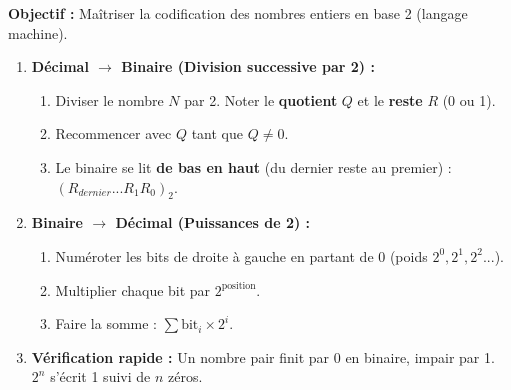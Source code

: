 \documentclass[11pt]{article}
\begin{document}
\begin{methode}
    \textbf{Objectif :} Maîtriser la codification des nombres entiers en base 2 (langage machine).
    \begin{enumerate}
        \item \textbf{Décimal $\to$ Binaire (Division successive par 2) :}
        \begin{enumerate}
            \item Diviser le nombre $N$ par 2. Noter le \textbf{quotient} $Q$ et le \textbf{reste} $R$ (0 ou 1).
            \item Recommencer avec $Q$ tant que $Q \neq 0$.
            \item Le binaire se lit \textbf{de bas en haut} (du dernier reste au premier) : $(R_{dernier} ... R_1 R_0)_2$.
        \end{enumerate}
        \item \textbf{Binaire $\to$ Décimal (Puissances de 2) :}
        \begin{enumerate}
            \item Numéroter les bits de droite à gauche en partant de 0 (poids $2^0, 2^1, 2^2...$).
            \item Multiplier chaque bit par $2^{\text{position}}$.
            \item Faire la somme : $\sum \text{bit}_i \times 2^i$.
        \end{enumerate}
        \item \textbf{Vérification rapide :} Un nombre pair finit par 0 en binaire, impair par 1. $2^n$ s'écrit 1 suivi de $n$ zéros.
    \end{enumerate}
\end{methode}
\end{document}
